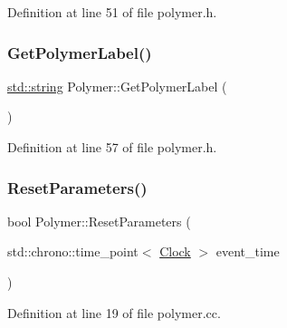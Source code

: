 Definition at line 51 of file polymer.\+h.

\mbox{\label{class_polymer_a80dbc65ac07e20dce3d9a2e9290c5e3b}} 
\subsubsection{\texorpdfstring{Get\+Polymer\+Label()}{GetPolymerLabel()}}
{\footnotesize\ttfamily \mbox{\hyperlink{glad_8h_ae84541b4f3d8e1ea24ec0f466a8c568b}{std\+::string}} Polymer\+::\+Get\+Polymer\+Label (\begin{DoxyParamCaption}{ }\end{DoxyParamCaption})\hspace{0.3cm}{\ttfamily [inline]}}



Definition at line 57 of file polymer.\+h.

\mbox{\label{class_polymer_aa20f1e5c79e8631afa291569d5030103}} 
\subsubsection{\texorpdfstring{Reset\+Parameters()}{ResetParameters()}}
{\footnotesize\ttfamily bool Polymer\+::\+Reset\+Parameters (\begin{DoxyParamCaption}\item[{std\+::chrono\+::time\+\_\+point$<$ \mbox{\hyperlink{universe_8h_a0ef8d951d1ca5ab3cfaf7ab4c7a6fd80}{Clock}} $>$}]{event\+\_\+time }\end{DoxyParamCaption})}



Definition at line 19 of file polymer.\+cc.

